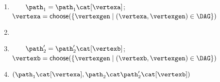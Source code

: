 {\begin{algorithm}
\begin{enumerate}
  \item {\label{step:newitr3}
        \ \ \ \ $\patha = \patha\cat[\vertexa]$; $\vertexa = \choice(\{\vertexgen\mid (\vertexa,\vertexgen)\in \digraph\})$\;}
  \item \ \ \;
  \item {\label{step:newitr4}
        \ \ \ \ $\pathb' = \pathb'\cat[\vertexb]$; $\vertexb = \choice(\{\vertexgen\mid (\vertexb,\vertexgen)\in \digraph\})$\;}
  \item {\label{step:ret2}  $(\patha\cat[\vertexa], \pathb\cat\pathb'\cat[\vertexb])$}\;
  \end{enumerate}
  \caption{$\ddfs(\vertexa,\vertexb)$}\label{alg:ddfs}
\end{algorithm}
}
\newcommand{\patharet}{\ensuremath{\overline{\patha}}}
\newcommand{\pathbret}{\ensuremath{\overline{\pathb}}}

